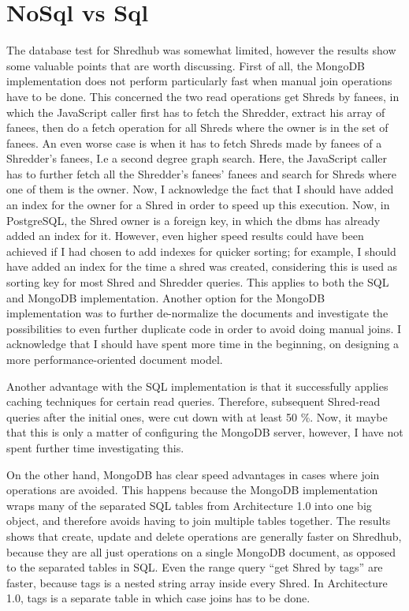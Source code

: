 \section{NoSql vs Sql}
The database test for Shredhub was somewhat limited, however the results show  some valuable points that are worth discussing. First of all, the MongoDB implementation does not perform particularly fast when manual join operations have to be done. This concerned the two read operations get Shreds by fanees, in which the JavaScript caller first has to fetch the Shredder, extract his array of fanees, then do a fetch operation for all Shreds where the owner is in the set of fanees. An even worse case is when it has to fetch Shreds made by fanees of a Shredder's fanees, I.e a second degree graph search. Here, the JavaScript caller has to further fetch all the Shredder's fanees' fanees and search for Shreds where one of them is the owner. Now, I acknowledge the fact that I should have added an index for the owner for a Shred in order to speed up this execution. Now, in PostgreSQL, the Shred owner is a foreign key, in which the dbms has already added an index for it. However, even higher speed results could have been achieved if I had chosen to add indexes for quicker sorting; for example, I should have added an index for the time a shred was created, considering this is used as sorting key for most Shred and Shredder queries. This applies to both the SQL and MongoDB implementation. Another option for the MongoDB implementation was to further de-normalize the documents and investigate the possibilities to even further duplicate code in order to avoid doing manual joins. I acknowledge that I should have spent more time in the beginning, on designing a more performance-oriented document model. 

Another advantage with the SQL implementation is that it successfully applies caching techniques for certain read queries. Therefore, subsequent Shred-read queries after the initial ones, were cut down with at least 50 \%. Now, it maybe that this is only a matter of configuring the MongoDB server, however, I have not spent further time investigating this. 

On the other hand, MongoDB has clear speed advantages in cases where join operations are avoided. This happens because the MongoDB implementation wraps many of the separated SQL tables from Architecture 1.0 into one big object, and therefore avoids having to join multiple tables together. The results shows that create, update and delete operations are generally faster on Shredhub, because they are all just operations on a single MongoDB document, as opposed to the separated tables in SQL. Even the range query ``get Shred by tags'' are faster, because tags is a nested string array inside every Shred. In Architecture 1.0, tags is a separate table in which case joins has to be done.

